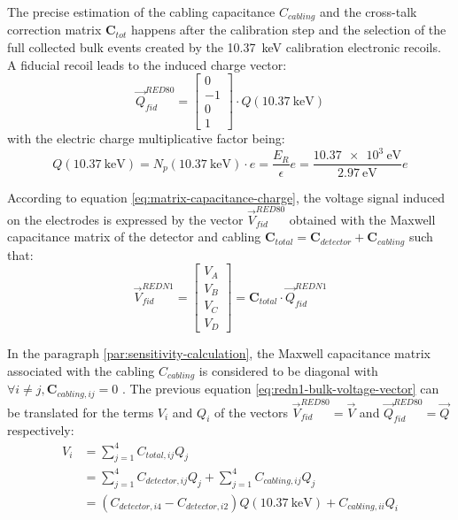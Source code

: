 The precise estimation of the cabling capacitance $C_{cabling}$ and the cross-talk correction matrix $\bm{C}_{tot}$ happens after the calibration step and the selection of the full collected bulk events created by the \SI{10.37}{\kilo\eV} calibration electronic recoils.
A fiducial recoil leads to the induced charge vector:
\begin{equation}
\vec{Q}_{fid}^{RED80} =
\begin{bmatrix}
0 \\ -1 \\ 0 \\ 1
\end{bmatrix}
\cdot Q(\SI{10.37}{\kilo\eV})
\end{equation}
with the electric charge multiplicative factor being:
\begin{equation}
Q(\SI{10.37}{\kilo\eV})
=
N_p(\SI{10.37}{\kilo\eV}) \cdot e
=
\frac{E_R}{\epsilon} e
=
\frac{\SI{10.37e3}{\eV}}{\SI{2.97}{\eV}} e
\end{equation}

According to equation \ref{eq:matrix-capacitance-charge}, the voltage signal induced on the electrodes is expressed by the vector $\vec{V}_{fid}^{RED80}$ obtained with the Maxwell capacitance matrix  of the detector and cabling $\bm{C}_{total} = \bm{C}_{detector} + \bm{C}_{cabling}$ such that:
\begin{equation}
\label{eq:redn1-bulk-voltage-vector}
\vec{V}_{fid}^{REDN1}
=
\begin{bmatrix}
V_A \\ V_B \\ V_C \\ V_D
\end{bmatrix}
=
\bm{C}_{total}
\cdot
\vec{Q}_{fid}^{REDN1}
\end{equation}

In the paragraph \ref{par:sensitivity-calculation}, the Maxwell capacitance matrix associated with the cabling $C_{cabling}$ is considered to be diagonal with $\forall i \neq j, \bm{C}_{cabling, ij} = 0$ . The previous equation \ref{eq:redn1-bulk-voltage-vector} can be translated for the terms $V_i$ and $Q_i$ of the vectors $\vec{V}_{fid}^{RED80}=\vec{V}$ and $\vec{Q}_{fid}^{RED80}=\vec{Q}$ respectively:
\begin{equation}
\begin{split}
V_{i}
&=
\sum_{j=1}^4 C_{total, ij} Q_j
\\
&=
\sum_{j=1}^4 C_{detector, ij} Q_j + \sum_{j=1}^4 C_{cabling, ij} Q_j
\\
&=
\left(
 C_{detector, i4} - C_{detector, i2}
\right)
Q(\SI{10.37}{\kilo\eV}) + C_{cabling, ii} Q_i
\end{split}
\end{equation}

